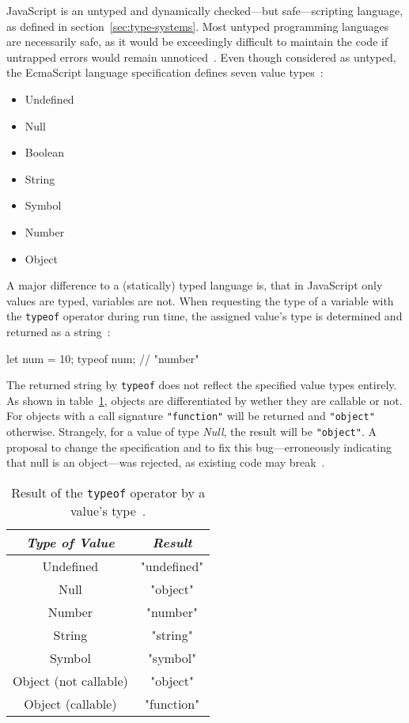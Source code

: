 JavaScript is an untyped and dynamically checked---but safe---scripting language, as defined in section~\ref{sec:type-systems}. Most untyped programming languages are necessarily safe, as it would be exceedingly difficult to maintain the code if untrapped errors would remain unnoticed~\cite[p.~4]{TypeSystems:Cardelli:2004}. Even though considered as untyped, the EcmaScript language specification defines seven value types~\cite[p.~16]{ES2015Spec:Ecma:2015}:
\begin{itemize}
  \item Undefined
  \item Null
  \item Boolean
  \item String
  \item Symbol
  \item Number
  \item Object
\end{itemize}
A major difference to a (statically) typed language is, that in JavaScript only values are typed, variables are not. When requesting the type of a variable with the \texttt{typeof} operator during run time, the assigned value's type is determined and returned as a string~\cite[p.~30]{YDKJSUpAndGoing:Simpson:2015}:
\begin{JsCode}[numbers=none]
let num = 10;
typeof num; // "number"
\end{JsCode}
The returned string by \texttt{typeof} does not reflect the specified value types entirely. As shown in table~\ref{tab:typeof}, objects are differentiated by wether they are callable or not. For objects with a call signature \texttt{"function"} will be returned and \texttt{"object"} otherwise. Strangely, for a value of type \emph{Null}, the result will be \texttt{"object"}. A proposal to change the specification and to fix this bug---erroneously indicating that null is an object---was rejected, as existing code may break~\cite{TypeofNull:Smith:2013, typeof:MDN:2017}.

\begin{table}
\caption{Result of the \texttt{typeof} operator by a value's type~\cite[p.~164]{ES2015Spec:Ecma:2015}.}\label{tab:typeof}
\centering
  \setlength{\tabcolsep}{5mm} %
  \def\arraystretch{1.25} %
  \begin{tabular}{|c|c|}
    \hline
    \emph{Type of Value} & \emph{Result} \\
    \hline \hline
    Undefined & "undefined" \\
    \hline
    Null & "object" \\
    \hline
    Number & "number" \\
    \hline
    String & "string" \\
    \hline
    Symbol & "symbol" \\
    \hline
    Object (not callable) & "object" \\
    \hline
    Object (callable) & "function" \\
    \hline
  \end{tabular}
\end{table}

